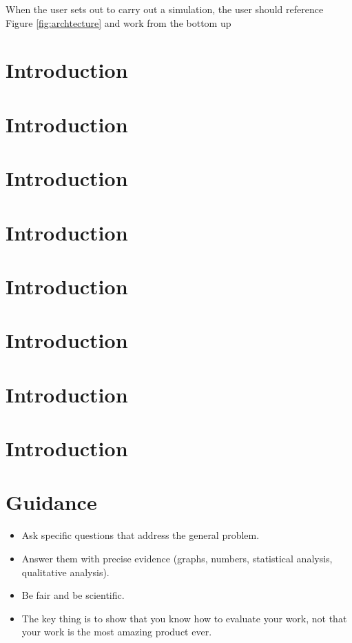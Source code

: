 \documentclass{l4proj}
\begin{document}
When the user sets out to carry out a simulation, the user should reference Figure \ref{fig:archtecture} and work from the bottom up
\section{Introduction}\label{sec:eval-intro}
\section{Introduction}\label{sec:eval-example1}
\section{Introduction}\label{sec:eval-example2}
\section{Introduction}\label{sec:eval-example3}
\section{Introduction}\label{sec:eval-example4}
\section{Introduction}\label{sec:eval-example5}
\section{Introduction}\label{sec:eval-example6}
\section{Introduction}\label{sec:eval-example7}

\section{Guidance}
\begin{itemize}
    \item
        Ask specific questions that address the general problem.
    \item
        Answer them with precise evidence (graphs, numbers, statistical
        analysis, qualitative analysis).
    \item
        Be fair and be scientific.
    \item
        The key thing is to show that you know how to evaluate your work, not
        that your work is the most amazing product ever.
\end{itemize}
\end{document}
